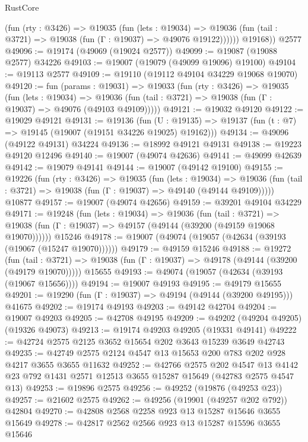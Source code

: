 \begin{lexlean}{RustCore}
\begin{coremodule}
            (fun (rty : @3426) =>
            @19035
              (fun (lets : @19034) =>
              @19036 (fun (tail : @3721) => @19038 (fun (Γ : @19037) => @49076 @19122))))))
        @19168))
    @2577
@49096 := @19174 (@49069 (@19024 @2577))
@49099 := @19087 (@19088 @2577) @34226
@49103 := @19007 (@19079 (@49099 @19096) @19100)
@49104 := @19113 @2577
@49109 := @19110 (@19112 @49104 @34229 @19068 @19070)
@49120 := fun (params : @19031) =>
  @19033
    (fun (rty : @3426) =>
    @19035
      (fun (lets : @19034) =>
      @19036 (fun (tail : @3721) => @19038 (fun (Γ : @19037) => @49076 (@49103 @49109)))))
@49121 := @19032 @49120
@49122 := @19029 @49121
@49131 := @19136
    (fun (U : @19135) => @19137 (fun (t : @7) => @19145 (@19007 (@19151 @34226 @19025) @19162)))
@49134 := @49096 (@49122 @49131) @34224
@49136 := @18992 @49121 @49131
@49138 := @19223 @49120 @12496
@49140 := @19007 (@49074 @42636)
@49141 := @49099 @42639
@49142 := @19079 @49141
@49144 := @19007 (@49142 @19100)
@49155 := @19226
    (fun (rty : @3426) =>
    @19035
      (fun (lets : @19034) =>
      @19036 (fun (tail : @3721) => @19038 (fun (Γ : @19037) => @49140 (@49144 @49109)))))
    @10877
@49157 := @19007 (@49074 @42656)
@49159 := @39201 @49104 @34229
@49171 := @19248
    (fun (lets : @19034) =>
    @19036
      (fun (tail : @3721) =>
      @19038 (fun (Γ : @19037) => @49157 (@49144 (@39200 (@49159 @19068 @19070))))))
    @15246
@49178 := @19007 (@49074 (@19057 (@42634 (@39193 (@19067 (@15247 @19070))))))
@49179 := @49159 @15246
@49188 := @19272
    (fun (tail : @3721) => @19038 (fun (Γ : @19037) => @49178 (@49144 (@39200 (@49179 @19070)))))
    @15655
@49193 := @49074 (@19057 (@42634 (@39193 (@19067 @15656))))
@49194 := @19007 @49193
@49195 := @49179 @15655
@49201 := @19290 (fun (Γ : @19037) => @49194 (@49144 (@39200 @49195))) @41675
@49202 := @19174 @49193
@49203 := @49142 @42704
@49204 := @19007 @49203
@49205 := @42708 @49195
@49209 := @49202 (@49204 @49205) (@19326 @49073)
@49213 := @19174 @49203 @49205 (@19331 @49141)
@49222 := @42724 @2575 @2125 @3652 @15654 @202 @3643 @15239 @3649 @42743
@49235 := @42749 @2575 @2124 @4547 @13 @15653 @200 @783 @202 @928 @4217 @3655 @3655 @11632
@49252 := @42766
    @2575
    @202
    @4547
    @13
    @4142
    @23
    @792
    @1431
    @2571
    @12513
    @3655
    @15287
    @15649
    (@42783 @2575 @4547 @13)
@49253 := @19896 @2575
@49256 := @49252 (@19876 (@49253 @23))
@49257 := @21602 @2575
@49262 := @49256 (@19901 (@49257 @202 @792)) @42804
@49270 := @42808 @2568 @2258 @923 @13 @15287 @15646 @3655 @15649
@49278 := @42817 @2562 @2566 @923 @13 @15287 @15596 @3655 @15646

\end{coremodule}
\end{lexlean}
